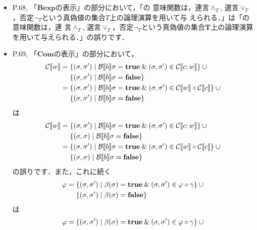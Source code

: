 \documentclass[12pt,titlepage,twoside,openright,dvipdfmx]{jsbook}
\theoremstyle{definition}
\begin{document}
\begin{itemize}
\item P.68,
  「$\mathbf{Bexp}$の表示」の部分において，「\termbooleanexpression{}の
  意味関数は，連言$\wedge_T$,
  選言$\vee_T$，否定$\neg_T$という真偽値の集合$T$上の論理演算を用いて与
  えられる．」は「\termbooleanexpression{}の意味関数は，連
  言$\wedge_T$,
  選言$\vee_T$，否定$\neg_T$という真偽値の集合$\mathbf{T}$上の論理演算
  を用いて与えられる．」の誤りです．
\item P.69, 「$\mathbf{Com}$の表示」の部分において，
  \begin{align*}
      \mathcal{C}\llbracket{w}\rrbracket = {} & \{(\sigma,\sigma')\mid  \mathcal{B}\llbracket{b}\rrbracket\sigma=\mathbf{true} \mathbin{\&} (\sigma,\sigma')\in\mathcal{C}\llbracket{c;w}\rrbracket\}\cup {}\\
                             & \{(\sigma,\sigma')\mid  \mathcal{B}\llbracket{b}\rrbracket\sigma=\mathbf{false}\} \\
      = {} & \{(\sigma,\sigma')\mid  \mathcal{B}\llbracket{b}\rrbracket\sigma=\mathbf{true} \mathbin{\&} (\sigma,\sigma')\in \mathcal{C}\llbracket{w}\rrbracket \circ \mathcal{C}\llbracket{c}\rrbracket \}\cup {}\\
                             & \{(\sigma,\sigma')\mid  \mathcal{B}\llbracket{b}\rrbracket\sigma=\mathbf{false}\}
  \end{align*}
  は
  \begin{align*}
      \mathcal{C}\llbracket{w}\rrbracket = {} & \{(\sigma,\sigma')\mid  \mathcal{B}\llbracket{b}\rrbracket\sigma=\mathbf{true} \mathbin{\&} (\sigma,\sigma')\in\mathcal{C}\llbracket{c;w}\rrbracket\}\cup {}\\
                             & \{(\sigma,\sigma)\mid  \mathcal{B}\llbracket{b}\rrbracket\sigma=\mathbf{false}\} \\
      = {} & \{(\sigma,\sigma')\mid  \mathcal{B}\llbracket{b}\rrbracket\sigma=\mathbf{true} \mathbin{\&} (\sigma,\sigma')\in \mathcal{C}\llbracket{w}\rrbracket \circ \mathcal{C}\llbracket{c}\rrbracket \}\cup {}\\
                             & \{(\sigma,\sigma)\mid  \mathcal{B}\llbracket{b}\rrbracket\sigma=\mathbf{false}\}
  \end{align*}
  の誤りです．また，これに続く
  \begin{align*}
    \varphi = {} & \{(\sigma,\sigma')\mid \beta(\sigma)=\mathbf{true} \mathbin{\&}
                   (\sigma,\sigma')\in \varphi\circ\gamma \} \cup {} \\
                 & \{(\sigma,\sigma')\mid \beta(\sigma)=\mathbf{false} \}
  \end{align*}
  は
  \begin{align*}
    \varphi = {} & \{(\sigma,\sigma')\mid \beta(\sigma)=\mathbf{true} \AND
                   (\sigma,\sigma')\in \varphi\circ\gamma \} \cup {} \\

\end{align*}
\end{itemize}
\end{document}
